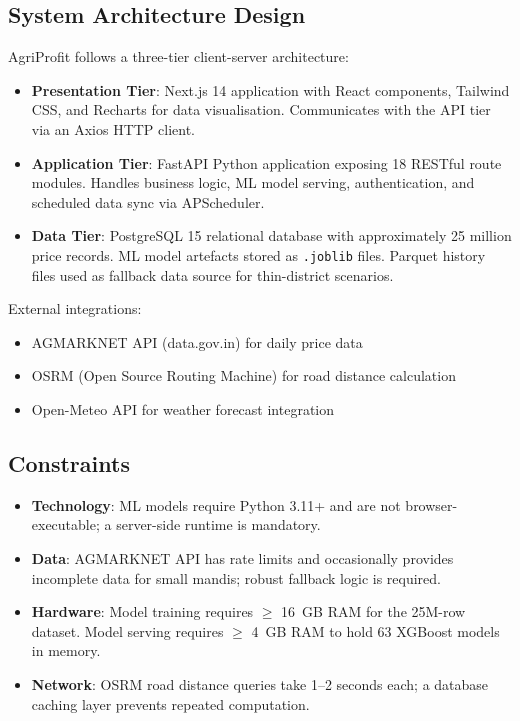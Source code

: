 \documentclass[12pt,a4paper]{report}
\begin{document}
\subsection{System Architecture Design}

AgriProfit follows a three-tier client-server architecture:

\begin{itemize}
    \item \textbf{Presentation Tier}: Next.js 14 application with React components,
    Tailwind CSS, and Recharts for data visualisation. Communicates with the API tier
    via an Axios HTTP client.
    \item \textbf{Application Tier}: FastAPI Python application exposing 18 RESTful
    route modules. Handles business logic, ML model serving, authentication, and
    scheduled data sync via APScheduler.
    \item \textbf{Data Tier}: PostgreSQL 15 relational database with approximately
    25 million price records. ML model artefacts stored as \texttt{.joblib} files.
    Parquet history files used as fallback data source for thin-district scenarios.
\end{itemize}

External integrations:
\begin{itemize}
    \item AGMARKNET API (data.gov.in) for daily price data
    \item OSRM (Open Source Routing Machine) for road distance calculation
    \item Open-Meteo API for weather forecast integration
\end{itemize}

\subsection{Constraints}

\begin{itemize}
    \item \textbf{Technology}: ML models require Python 3.11+ and are not
    browser-executable; a server-side runtime is mandatory.
    \item \textbf{Data}: AGMARKNET API has rate limits and occasionally provides
    incomplete data for small mandis; robust fallback logic is required.
    \item \textbf{Hardware}: Model training requires $\geq$ 16~GB RAM for the
    25M-row dataset. Model serving requires $\geq$ 4~GB RAM to hold 63 XGBoost models
    in memory.
    \item \textbf{Network}: OSRM road distance queries take 1--2 seconds each;
    a database caching layer prevents repeated computation.
\end{itemize}
\end{document}
